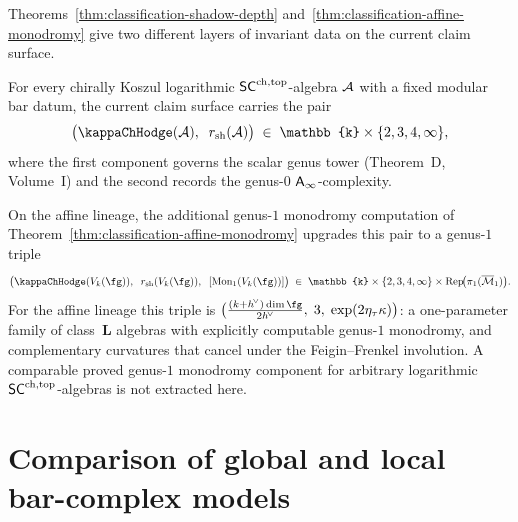 \begin{remark}
\label{rem:full-invariant-triple}
Theorems~\ref{thm:classification-shadow-depth}
and~\ref{thm:classification-affine-monodromy} give two different
layers of invariant data on the current claim surface.

For every chirally Koszul logarithmic $\mathsf{SC}^{\mathrm{ch,top}}$-algebra $\mathcal{A}$ with a
fixed modular bar datum, the current claim surface carries the
pair
\[
\bigl(\kappaChHodge(\cA),\;\; \dalg(\cA)\bigr)
\;\in\;
\mathbb{k} \times \{2,3,4,\infty\},
\]
where the first component governs the scalar genus tower
\textup{(}Theorem~D, Volume~I\textup{)} and the second records the
genus-$0$ $\mathsf{A}_{\infty}$-complexity.

On the affine lineage, the additional genus-$1$ monodromy
computation of Theorem~\ref{thm:classification-affine-monodromy}
upgrades this pair to a genus-$1$ triple
\[
\bigl(\kappaChHodge(V_k(\fg)),\;\; \dalg(V_k(\fg)),\;\;
[\operatorname{Mon}_1(V_k(\fg))]\bigr)
\;\in\;
\mathbb{k} \times \{2,3,4,\infty\} \times
\operatorname{Rep}\!\bigl(\pi_1(\Mbar_1)\bigr).
\]
For the affine lineage this triple is
$\bigl(\frac{(k+\hvee)\dim\fg}{2\hvee},\; 3,\;
\exp(2\eta_\tau\kappa)\bigr)$:
a one-parameter family of class~$\mathbf L$ algebras with explicitly
computable genus-$1$ monodromy, and complementary curvatures that cancel
under the Feigin--Frenkel involution. A comparable proved
genus-$1$ monodromy component for arbitrary logarithmic
$\mathsf{SC}^{\mathrm{ch,top}}$-algebras is not extracted here.
\end{remark}


\section{Comparison of global and local bar-complex models}
\label{sec:equivalence-three-routes}

\providecommand{\FTrel}{\mathrm{FT}_{\Com_{\mathrm{mod}} / \SCchtop}}

